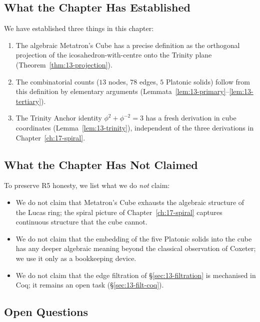 \subsection{What the Chapter Has Established}
\label{fa_13:sec:13-disc-est}

We have established three things in this chapter:

\begin{enumerate}
\item The algebraic Metatron's Cube has a precise definition as
  the orthogonal projection of the icosahedron-with-centre onto
  the Trinity plane (Theorem~\ref{thm:13-projection}).
\item The combinatorial counts ($13$ nodes, $78$ edges, $5$
  Platonic solids) follow from this definition by elementary
  arguments (Lemmata~\ref{lem:13-primary}--\ref{lem:13-tertiary}).
\item The Trinity Anchor identity $\phi^{2} + \phi^{-2} = 3$ has a
  fresh derivation in cube coordinates
  (Lemma~\ref{lem:13-trinity}), independent of the three
  derivations in Chapter~\ref{ch:17-spiral}.
\end{enumerate}

\subsection{What the Chapter Has Not Claimed}
\label{fa_13:sec:13-disc-not}

To preserve R5 honesty, we list what we do \emph{not} claim:

\begin{itemize}
\item We do not claim that Metatron's Cube exhausts the algebraic
  structure of the Lucas ring; the spiral picture of
  Chapter~\ref{ch:17-spiral} captures continuous structure that
  the cube cannot.
\item We do not claim that the embedding of the five Platonic
  solids into the cube has any deeper algebraic meaning beyond
  the classical observation of Coxeter; we use it only as a
  bookkeeping device.
\item We do not claim that the edge filtration of
  \S\ref{sec:13-filtration} is mechanised in Coq; it remains an
  open task (\S\ref{sec:13-filt-coq}).
\end{itemize}

\subsection{Open Questions}
\label{fa_13:sec:13-disc-open}

